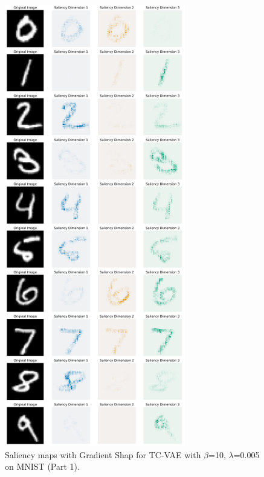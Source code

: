 \begin{figure}[h]
\centering
    \includegraphics[width=0.7\textwidth]{images/vae/tc_vae_10_sms_mnist_lambda_0_005_1.PNG}
\caption{Saliency maps with Gradient Shap for TC-VAE with  $\beta$=10, $\lambda$=0.005 on MNIST (Part 1).}\label{fig:tcvae10smsmnistlambda00051}
\end{figure}


